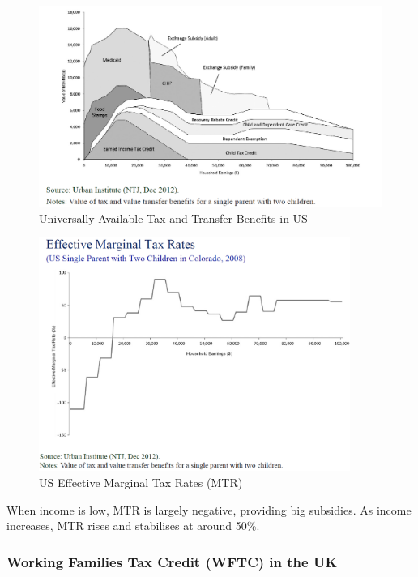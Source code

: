             \begin{figure}[H]
                \centering
                \includegraphics[width=5in]{images/ch13/13_US_Tax_and_trans.png}
                \caption{Universally Available Tax and Transfer Benefits in US}
            \end{figure}
    
            \begin{figure}[H]
                \centering
                \includegraphics[width=4in]{images/ch13/13_US_MTR.png}
                \caption{US Effective Marginal Tax Rates (MTR)}
            \end{figure}
            When income is low, MTR is largely negative, providing big subsidies. As income increases, MTR rises and stabilises at around 50\%.

        \subsubsection{Working Families Tax Credit (WFTC) in the UK}

